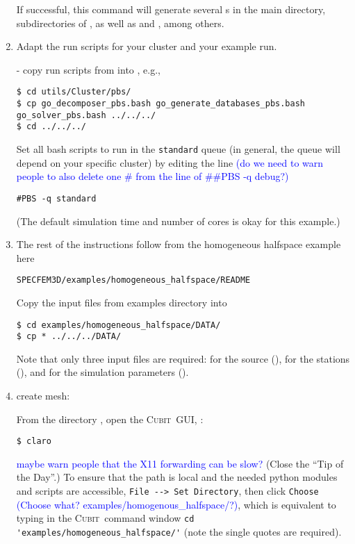\documentclass[10pt,fleqn,letterpaper]{article}
\newcommand{\cubit}{\textsc{Cubit}}
\newcommand{\blue}[1]{\textcolor{blue}{#1}}
\begin{document}
\begin{enumerate}
If successful, this command will generate several s in the  main directory, subdirectories of , as well as  and , among others.

\item Adapt the run scripts for your cluster and your example run.

- copy run scripts from  into , e.g.,
\begin{lstlisting}
$ cd utils/Cluster/pbs/
$ cp go_decomposer_pbs.bash go_generate_databases_pbs.bash go_solver_pbs.bash ../../../
$ cd ../../../
\end{lstlisting}

Set all bash scripts to run in the \texttt{standard} queue (in general, the queue will depend on your specific cluster) by editing the line
\blue{(do we need to warn people to also delete one \# from the line of \#\#PBS -q debug?)}
\begin{lstlisting}
#PBS -q standard
\end{lstlisting}
(The default simulation time and number of cores is okay for this example.)
 
\item The rest of the instructions follow from the homogeneous halfspace example here
\begin{lstlisting}
SPECFEM3D/examples/homogeneous_halfspace/README
\end{lstlisting}

Copy the input files from examples directory into 
\begin{lstlisting}
$ cd examples/homogeneous_halfspace/DATA/
$ cp * ../../../DATA/
\end{lstlisting}
%
Note that only three input files are required: for the source (), for the stations (), and for the simulation parameters ().

\item create mesh:

From the directory , open the \cubit\ GUI, :
\begin{lstlisting}
$ claro
\end{lstlisting}
\blue{maybe warn people that the X11 forwarding can be slow?}
%
(Close the ``Tip of the Day''.)
To ensure that the path is local and the needed python modules and scripts are accessible, \verb+File --> Set Directory+, then click \verb+Choose+  \blue{(Choose what? examples/homogenous\_halfspace/?)}, which is equivalent to typing in the \cubit\ command window \verb+cd 'examples/homogeneous_halfspace/'+ (note the single quotes are required).


\end{enumerate}
\end{document}
